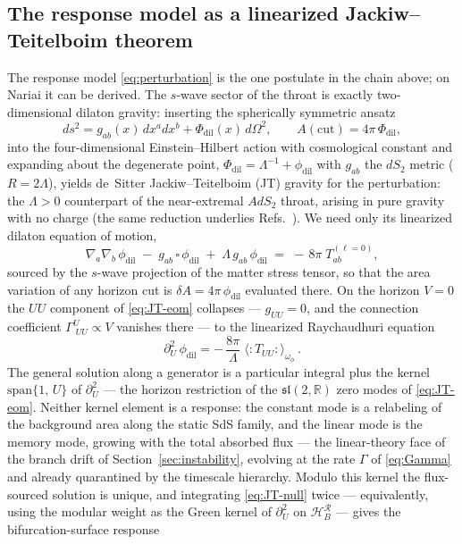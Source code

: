 \documentclass[11pt]{article}
\newcommand{\Nariai}{Nariai}
\begin{document}
\subsection{The response model as a linearized Jackiw--Teitelboim theorem}
\label{sec:JT}

The response model \eqref{eq:perturbation} is the one postulate in the chain above; on \Nariai{} it can be derived. The $s$-wave sector of the throat is exactly two-dimensional dilaton gravity: inserting the spherically symmetric ansatz
\begin{equation}
ds^2 = g_{ab}(x)\, dx^a dx^b + \Phi_{\mathrm{dil}}(x)\, d\Omega^2,
\qquad
A(\mathrm{cut}) = 4\pi\, \Phi_{\mathrm{dil}},
\label{eq:JT-ansatz}
\end{equation}
into the four-dimensional Einstein--Hilbert action with cosmological constant and expanding about the degenerate point, $\Phi_{\mathrm{dil}} = \Lambda^{-1} + \phi_{\mathrm{dil}}$ with $g_{ab}$ the $dS_2$ metric ($R = 2\Lambda$), yields de~Sitter Jackiw--Teitelboim (JT) gravity for the perturbation: the $\Lambda > 0$ counterpart of the near-extremal $AdS_2$ throat, arising in pure gravity with no charge \cite{MertensTuriaci} (the same reduction underlies Refs.~\cite{FanarasVilenkin,Rusalev}). We need only its linearized dilaton equation of motion,
\begin{equation}
\nabla_a \nabla_b\, \phi_{\mathrm{dil}} \;-\; g_{ab}\,\square\, \phi_{\mathrm{dil}} \;+\; \Lambda\, g_{ab}\, \phi_{\mathrm{dil}}
\;=\; -\,8\pi\; T^{(\ell=0)}_{ab},
\label{eq:JT-eom}
\end{equation}
sourced by the $s$-wave projection of the matter stress tensor, so that the area variation of any horizon cut is $\delta A = 4\pi\,\phi_{\mathrm{dil}}$ evaluated there. On the horizon $V = 0$ the $UU$ component of \eqref{eq:JT-eom} collapses --- $g_{UU} = 0$, and the connection coefficient $\Gamma^{U}_{\;UU} \propto V$ vanishes there --- to the linearized Raychaudhuri equation
\begin{equation}
\partial_U^2\, \phi_{\mathrm{dil}}
= -\,\frac{8\pi}{\Lambda}\; \langle{:}T_{UU}{:}\rangle_{\omega_\phi}\,.
\label{eq:JT-null}
\end{equation}
The general solution along a generator is a particular integral plus the kernel $\mathrm{span}\{1,\, U\}$ of $\partial_U^2$ --- the horizon restriction of the $\mathfrak{sl}(2,\mathbb{R})$ zero modes of \eqref{eq:JT-eom}. Neither kernel element is a response: the constant mode is a relabeling of the background area along the static SdS family, and the linear mode is the memory mode, growing with the total absorbed flux --- the linear-theory face of the branch drift of Section~\ref{sec:instability}, evolving at the rate $\Gamma$ of \eqref{eq:Gamma} and already quarantined by the timescale hierarchy. Modulo this kernel the flux-sourced solution is unique, and integrating \eqref{eq:JT-null} twice --- equivalently, using the modular weight as the Green kernel of $\partial_U^2$ on $\mathcal{H}_B^{\mathcal{R}}$ --- gives the bifurcation-surface response
\end{document}

